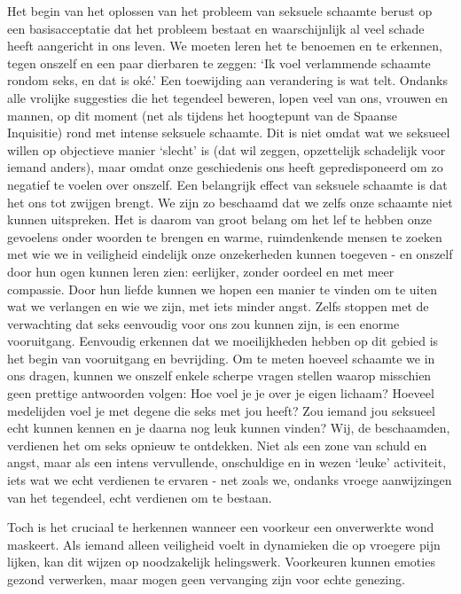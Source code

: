 Het begin van het oplossen van het probleem van seksuele schaamte berust op een basisacceptatie dat het probleem bestaat en waarschijnlijk al veel schade heeft aangericht in ons leven. We moeten leren het te benoemen en te erkennen, tegen onszelf en een paar dierbaren te zeggen: ‘Ik voel verlammende schaamte rondom seks, en dat is oké.’ Een toewijding aan verandering is wat telt. Ondanks alle vrolijke suggesties die het tegendeel beweren, lopen veel van ons, vrouwen en mannen, op dit moment (net als tijdens het hoogtepunt van de Spaanse Inquisitie) rond met intense seksuele schaamte. Dit is niet omdat wat we seksueel willen op objectieve manier ‘slecht’ is (dat wil zeggen, opzettelijk schadelijk voor iemand anders), maar omdat onze geschiedenis ons heeft gepredisponeerd om zo negatief te voelen over onszelf.
Een belangrijk effect van seksuele schaamte is dat het ons tot zwijgen brengt. We zijn zo beschaamd dat we zelfs onze schaamte niet kunnen uitspreken. Het is daarom van groot belang om het lef te hebben onze gevoelens onder woorden te brengen en warme, ruimdenkende mensen te zoeken met wie we in veiligheid eindelijk onze onzekerheden kunnen toegeven - en onszelf door hun ogen kunnen leren zien: eerlijker, zonder oordeel en met meer compassie. Door hun liefde kunnen we hopen een manier te vinden om te uiten wat we verlangen en wie we zijn, met iets minder angst.
Zelfs stoppen met de verwachting dat seks eenvoudig voor ons zou kunnen zijn, is een enorme vooruitgang. Eenvoudig erkennen dat we moeilijkheden hebben op dit gebied is het begin van vooruitgang en bevrijding.
Om te meten hoeveel schaamte we in ons dragen, kunnen we onszelf enkele scherpe vragen stellen waarop misschien geen prettige antwoorden volgen:
Hoe voel je je over je eigen lichaam?
Hoeveel medelijden voel je met degene die seks met jou heeft?
Zou iemand jou seksueel echt kunnen kennen en je daarna nog leuk kunnen vinden?
Wij, de beschaamden, verdienen het om seks opnieuw te ontdekken. Niet als een zone van schuld en angst, maar als een intens vervullende, onschuldige en in wezen ‘leuke’ activiteit, iets wat we echt verdienen te ervaren - net zoals we, ondanks vroege aanwijzingen van het tegendeel, echt verdienen om te bestaan.

Toch is het cruciaal te herkennen wanneer een voorkeur een onverwerkte wond maskeert. Als iemand alleen veiligheid voelt in dynamieken die op vroegere pijn lijken, kan dit wijzen op noodzakelijk helingswerk. Voorkeuren kunnen emoties gezond verwerken, maar mogen geen vervanging zijn voor echte genezing.


